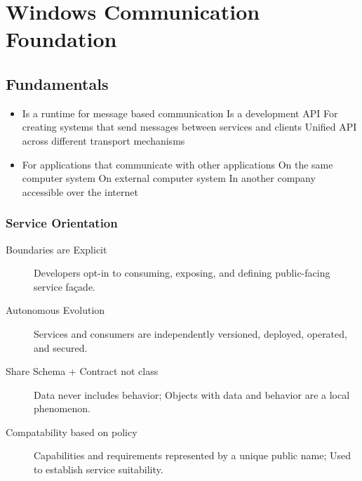 \documentclass[a4paper,10pt]{scrreprt}
\begin{document}
\chapter{Windows Communication Foundation}

\section{Fundamentals}
\begin{itemize}
\item Is a runtime for message based communication
Is a development API
\subitem For creating systems that send messages between services and
clients
\subitem Unified API across different transport mechanisms
\item For applications that communicate with other
applications
\subitem On the same computer system
\subitem On external computer system
\subitem In another company accessible over the internet
\end{itemize}

\subsection{Service Orientation}
\begin{description}
 \item[Boundaries are Explicit] Developers opt-in to consuming, exposing,
and defining public-facing service façade.
\item [	Autonomous Evolution] Services and consumers are independently
versioned, deployed, operated, and
secured.
\item[Share Schema + Contract not class]Data never includes behavior;
Objects with data and behavior are a local
phenomenon.
\item[Compatability based on policy] Capabilities and requirements represented
by a unique public name; Used to establish
service suitability.

\end{description}
\end{document}
